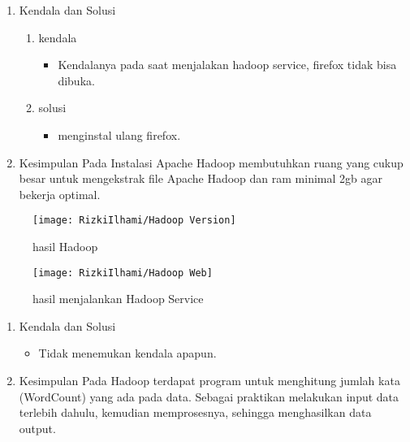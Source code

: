 

\begin{enumerate}

\item Kendala dan Solusi
\begin{enumerate}
    \item kendala
\begin{itemize}
    \item Kendalanya pada saat menjalakan hadoop service, firefox tidak bisa dibuka.
\end{itemize}
    \item solusi
\begin{itemize}
    \item menginstal ulang firefox.
\end{itemize}
\end{enumerate}

\item Kesimpulan
\newline
    Pada Instalasi Apache Hadoop membutuhkan ruang yang
    cukup besar untuk mengekstrak file Apache Hadoop dan ram
    minimal 2gb agar bekerja optimal.


\end{enumerate}

\begin{figure}[!ht]
    \texttt{[image: RizkiIlhami/Hadoop Version]}
    \caption{hasil Hadoop}
    \label{gam:Hasil}
\end{figure}

\begin{figure}[!ht]
    \texttt{[image: RizkiIlhami/Hadoop Web]}
    \caption{hasil menjalankan Hadoop Service}
    \label{gam:Hasil}
\end{figure}

\clearpage
{}
\begin{enumerate}
\item Kendala dan Solusi

\begin{itemize}
\item Tidak menemukan kendala apapun.
\end{itemize}

\item Kesimpulan
\newline
    Pada Hadoop terdapat program untuk menghitung jumlah kata 
    (WordCount) yang ada pada data. Sebagai praktikan melakukan input data terlebih
    dahulu, kemudian memprosesnya, sehingga menghasilkan data output.

\end{enumerate}

